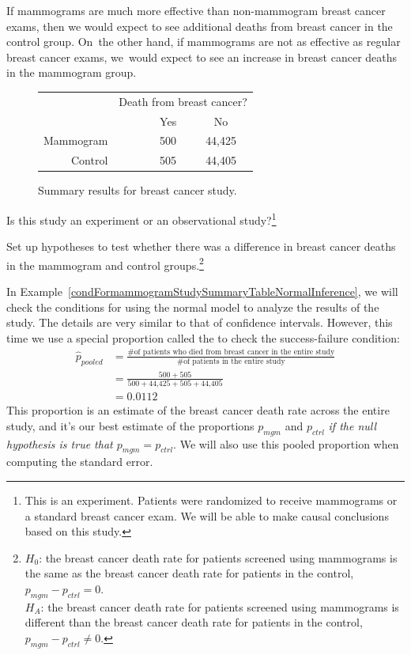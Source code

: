 If mammograms are much more effective than non-mammogram breast cancer exams, then we would expect to see additional deaths from breast cancer in the control group. On~the other hand, if mammograms are not as effective as regular breast cancer exams, we~would expect to see an increase in breast cancer deaths in the mammogram group.

\begin{figure}[h]
\centering
\begin{tabular}{rrcc}
	& \multicolumn{3}{c}{Death from breast cancer?} \\
  \cline{2-4}
 & \ \hspace{3mm}\ & Yes & No \\
  \hline
Mammogram && 500 & 44,425 \\
Control && 505 & 44,405 \\
   \hline
\end{tabular}
\caption{Summary results for breast cancer study.}
\label{mammogramStudySummaryTable}
\end{figure}

\begin{exercise}
Is this study an experiment or an observational study?\footnote{This is an experiment. Patients were randomized to receive mammograms or a standard breast cancer exam. We will be able to make causal conclusions based on this study.}
\end{exercise}

\begin{exercise} \label{htFormammogramStudySummaryTable}
Set up hypotheses to test whether there was a difference in breast cancer deaths in the mammogram and control groups.\footnote{$H_0$: the breast cancer death rate for patients screened using mammograms is the same as the breast cancer death rate for patients in the control, $p_{mgm} - p_{ctrl} = 0$. \\ $H_A$: the breast cancer death rate for patients screened using mammograms is different than the breast cancer death rate for patients in the control, $p_{mgm} - p_{ctrl} \neq 0$.}
\end{exercise}

In Example~\ref{condFormammogramStudySummaryTableNormalInference}, we will check the conditions for using the normal model to analyze the results of the study. The details are very similar to that of confidence intervals. However, this time we use a special proportion called the  to check the success-failure condition:
\begin{align*}
\hat{p}_{\textit{pooled}}
    &= \frac
        {\text{\# of patients who died from breast cancer in the
            entire study}}
        {\text{\# of patients in the entire study}} \\
	&= \frac{500 + 505}{500 + \text{44,425} + 505 + \text{44,405}} \\
	&= 0.0112
\end{align*}
This proportion is an estimate of the breast cancer death rate across the entire study, and it's our best estimate of the proportions $p_{mgm}$ and $p_{ctrl}$ \emph{if the null hypothesis is true that $p_{mgm} = p_{ctrl}$}. We will also use this pooled proportion when computing the standard error.

